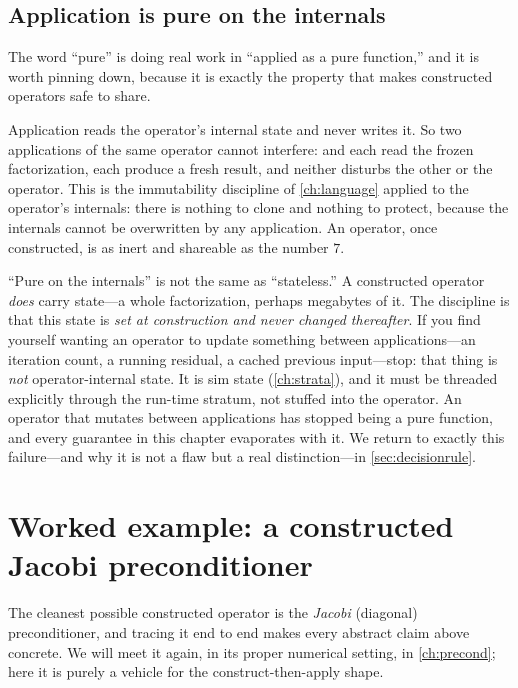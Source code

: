 \subsection{Application is pure on the internals}

The word ``pure'' is doing real work in ``applied as a pure function,'' and it is
worth pinning down, because it is exactly the property that makes constructed
operators safe to share.

Application reads the operator's internal state and never writes it. So two
applications of the same operator cannot interfere:  and
 each read the frozen factorization, each produce a fresh result,
and neither disturbs the other or the operator. This is the immutability discipline
of \cref{ch:language} applied to the operator's internals: there is nothing to clone
and nothing to protect, because the internals cannot be overwritten by any
application. An operator, once constructed, is as inert and shareable as the number
$7$.

\begin{pitfall}
``Pure on the internals'' is not the same as ``stateless.'' A constructed operator
\emph{does} carry state---a whole factorization, perhaps megabytes of it. The
discipline is that this state is \emph{set at construction and never changed
thereafter}. If you find yourself wanting an operator to update something between
applications---an iteration count, a running residual, a cached previous input---stop:
that thing is \emph{not} operator-internal state. It is sim state (\cref{ch:strata}),
and it must be threaded explicitly through the run-time stratum, not stuffed into the
operator. An operator that mutates between applications has stopped being a pure
function, and every guarantee in this chapter evaporates with it. We return to
exactly this failure---and why it is not a flaw but a real distinction---in
\cref{sec:decisionrule}.
\end{pitfall}

\section{Worked example: a constructed Jacobi preconditioner}

The cleanest possible constructed operator is the \emph{Jacobi} (diagonal)
preconditioner, and tracing it end to end makes every abstract claim above concrete.
We will meet it again, in its proper numerical setting, in \cref{ch:precond}; here it
is purely a vehicle for the construct-then-apply shape.

